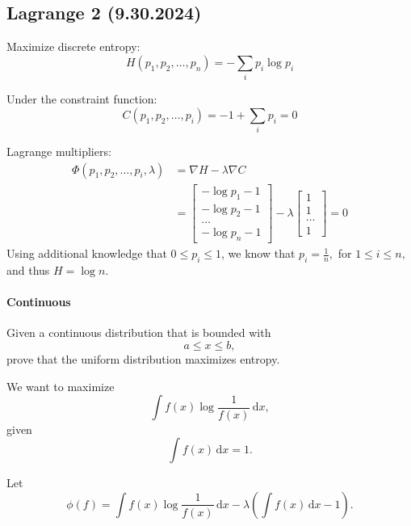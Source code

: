 \documentclass[12pt]{article}
\newcommand{\diffn}[1]{\,\mathrm{d}{#1}}
\begin{document}
\subsection{Lagrange 2 (9.30.2024)}
Maximize discrete entropy:
\[   H(p_1,p_2,\dots,p_n) = -\sum_i p_i \log p_i \]

Under the constraint function:
\[C(p_1,p_2,\dots,p_i)=-1 + \sum_i p_i = 0\]

Lagrange multipliers:
\begin{align*}
    \Phi(p_1,p_2,\dots,p_i,\lambda) &= \nabla H - \lambda\nabla C \\
    &= \begin{bmatrix}
        -\log p_1-1\\
        -\log p_2-1\\
        \dots\\
        -\log p_n-1
    \end{bmatrix} -\lambda\begin{bmatrix}
        1\\1\\\dots\\1
    \end{bmatrix} = 0
\end{align*}
Using additional knowledge that $0\le p_i \le 1$, we know that $p_i=\frac{1}{n},$ for $1\le i\le n,$ and thus $H=\log n.$



\paragraph{Continuous} Given a continuous distribution that is bounded with
\[a\le x\le b,\]
prove that the uniform distribution maximizes entropy. \medskip 

We want to maximize 
\[\int f(x)\log\frac{1}{f(x)}\diffn{x},\] given
\[\int f(x)\diffn{x}=1.\]

Let 
\[\phi(f)=\int f(x)\log\frac{1}{f(x)}\diffn{x}-\lambda\left(\int f(x)\diffn{x}-1\right).\]


\begin{figure}[!ht]
\centering
{}
\end{figure}
\end{document}
